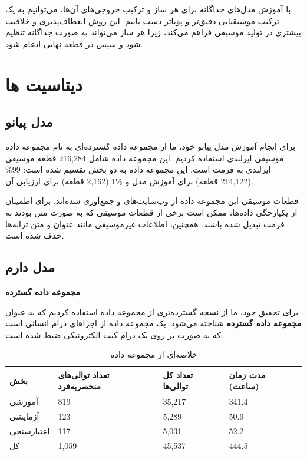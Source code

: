 با آموزش مدل‌های جداگانه برای هر ساز و ترکیب خروجی‌های آن‌ها، می‌توانیم به یک ترکیب موسیقیایی دقیق‌تر و پویا‌تر دست یابیم. این روش انعطاف‌پذیری و خلاقیت بیشتری در تولید موسیقی فراهم می‌کند، زیرا هر ساز می‌تواند به صورت جداگانه تنظیم شود و سپس در قطعه نهایی ادغام شود.

\section{دیتاسیت ها}
\subsection{مدل پیانو}

برای انجام آموزش مدل پیانو خود، ما از مجموعه داده گسترده‌ای به نام مجموعه داده  موسیقی ایرلندی  \cite{DBLP:conf/hcmir/WuLY023} استفاده کردیم. این مجموعه داده شامل 216,284 قطعه موسیقی ایرلندی به فرمت  است. این مجموعه داده به دو بخش تقسیم شده است: 99\% (214,122 قطعه) برای آموزش مدل و \%1 (2,162 قطعه) برای ارزیابی آن.

قطعات موسیقی این مجموعه داده از وب‌سایت‌های  و  جمع‌آوری شده‌اند. برای اطمینان از یکپارچگی داده‌ها، ممکن است برخی از قطعات موسیقی که به صورت متن بودند به فرمت  تبدیل شده باشند. همچنین، اطلاعات غیرموسیقی مانند عنوان و متن ترانه‌ها حذف شده است.
\subsection{مدل دارم}
\textbf{مجموعه داده گسترده  \cite{callender2020improving}}

برای تحقیق خود، ما از نسخه گسترده‌تری از مجموعه داده 
استفاده کردیم که به عنوان \textbf{مجموعه داده گسترده }
شناخته می‌شود.  یک مجموعه داده از اجراهای درام انسانی است که به صورت
 بر روی یک درام کیت الکترونیکی  ضبط شده است.

\begin{table}[!ht]
      \centering
      \begin{tabular}{|l|l|l|l|}
            \hline
            بخش        & تعداد توالی‌های منحصربه‌فرد & تعداد کل توالی‌ها & مدت زمان (ساعت) \\ \hline
            آموزشی     & 819                       & 35,217           & 341.4           \\ \hline
            آزمایشی    & 123                       & 5,289            & 50.9            \\ \hline
            اعتبارسنجی & 117                       & 5,031            & 52.2            \\ \hline
            کل         & 1,059                     & 45,537           & 444.5           \\ \hline
      \end{tabular}
      \caption{خلاصه‌ای از مجموعه داده}
      \label{drumInfo}
\end{table}

